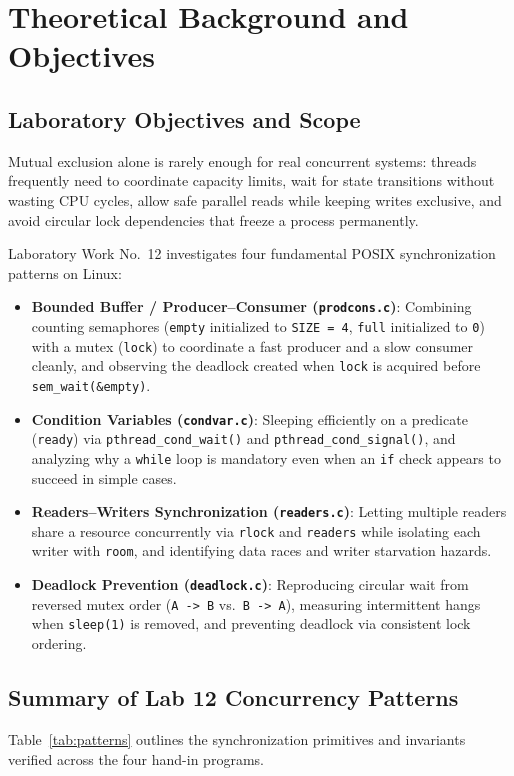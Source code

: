 \documentclass[12pt,a4paper]{article}
\begin{document}
\section{Theoretical Background and Objectives}

\subsection{Laboratory Objectives and Scope}
Mutual exclusion alone is rarely enough for real concurrent systems: threads frequently need to coordinate capacity limits, wait for state transitions without wasting CPU cycles, allow safe parallel reads while keeping writes exclusive, and avoid circular lock dependencies that freeze a process permanently.

Laboratory Work No.~12 investigates four fundamental POSIX synchronization patterns on Linux:
\begin{itemize}
    \item \textbf{Bounded Buffer / Producer--Consumer (\texttt{prodcons.c})}: Combining counting semaphores (\texttt{empty} initialized to \texttt{SIZE = 4}, \texttt{full} initialized to \texttt{0}) with a mutex (\texttt{lock}) to coordinate a fast producer and a slow consumer cleanly, and observing the deadlock created when \texttt{lock} is acquired before \texttt{sem\_\allowbreak wait(\&empty)}.
    \item \textbf{Condition Variables (\texttt{condvar.c})}: Sleeping efficiently on a predicate (\texttt{ready}) via \texttt{pthread\_\allowbreak cond\_\allowbreak wait()} and \texttt{pthread\_\allowbreak cond\_\allowbreak signal()}, and analyzing why a \texttt{while} loop is mandatory even when an \texttt{if} check appears to succeed in simple cases.
    \item \textbf{Readers--Writers Synchronization (\texttt{readers.c})}: Letting multiple readers share a resource concurrently via \texttt{rlock} and \texttt{readers} while isolating each writer with \texttt{room}, and identifying data races and writer starvation hazards.
    \item \textbf{Deadlock Prevention (\texttt{deadlock.c})}: Reproducing circular wait from reversed mutex order (\texttt{A -> B} vs.~\texttt{B -> A}), measuring intermittent hangs when \texttt{sleep(1)} is removed, and preventing deadlock via consistent lock ordering.
\end{itemize}

\subsection{Summary of Lab 12 Concurrency Patterns}
Table~\ref{tab:patterns} outlines the synchronization primitives and invariants verified across the four hand-in programs.
\end{document}
